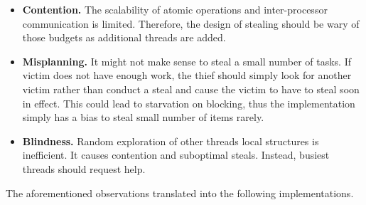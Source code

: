 \documentclass[12pt,a4paper,twoside]{report}
\begin{document}
\begin{itemize}
    \item \textbf{Contention.} The scalability of atomic operations and inter-processor communication is limited. Therefore, the design of stealing should be wary of those budgets as additional threads are added. 
    \item \textbf{Misplanning.} It might not make sense to steal a small number of tasks. If victim does not have enough work, the thief should simply look for another victim rather than conduct a steal and cause the victim to have to steal soon in effect. This could lead to starvation on blocking, thus the implementation simply has a bias to steal small number of items rarely. 
    \item \textbf{Blindness.} Random exploration of other threads local structures is inefficient. It causes contention and suboptimal steals. Instead, busiest threads should request help. 
\end{itemize}

The aforementioned observations translated into the following implementations. 
\end{document}
